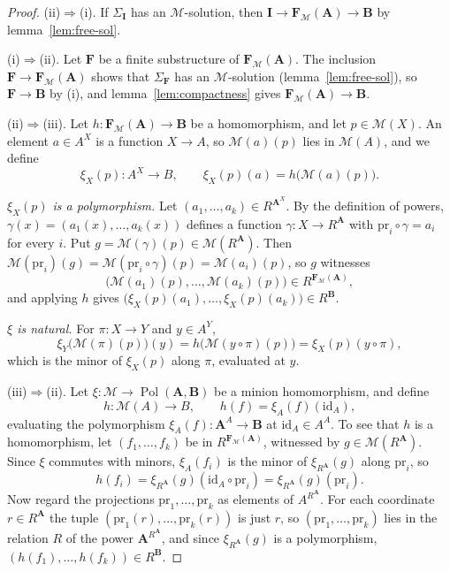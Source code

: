 \documentclass[11pt]{article}
\theoremstyle{plain}
\theoremstyle{definition}
\newcommand{\Pol}{\operatorname{Pol}}
\newcommand{\pr}{\mathrm{pr}}
\newcommand{\id}{\mathrm{id}}
\newcommand{\bA}{\mathbf{A}}
\newcommand{\bB}{\mathbf{B}}
\newcommand{\bI}{\mathbf{I}}
\newcommand{\bF}{\mathbf{F}}
\newcommand{\M}{\mathscr{M}}
\begin{document}
\begin{proof}
(ii)$\Rightarrow$(i). If $\Sigma_{\bI}$ has an $\M$-solution, then $\bI\to\bF_\M(\bA)\to\bB$ by lemma~\ref{lem:free-sol}.

(i)$\Rightarrow$(ii). Let $\bF$ be a finite substructure of $\bF_\M(\bA)$. The inclusion $\bF\to\bF_\M(\bA)$ shows that $\Sigma_{\bF}$ has an $\M$-solution (lemma~\ref{lem:free-sol}), so $\bF\to\bB$ by (i), and lemma~\ref{lem:compactness} gives $\bF_\M(\bA)\to\bB$.

(ii)$\Rightarrow$(iii). Let $h\colon\bF_\M(\bA)\to\bB$ be a homomorphism, and let $p\in\M(X)$. An element $a\in A^X$ is a function $X\to A$, so $\M(a)(p)$ lies in $\M(A)$, and we define
\[
\xi_X(p)\colon A^X\to B,\qquad\xi_X(p)(a)=h\big(\M(a)(p)\big).
\]

\emph{$\xi_X(p)$ is a polymorphism.} Let $(a_1,\dots,a_k)\in R^{\bA^X}$. By the definition of powers, $\gamma(x)=(a_1(x),\dots,a_k(x))$ defines a function $\gamma\colon X\to R^{\bA}$ with $\pr_i\circ\gamma=a_i$ for every $i$. Put $g=\M(\gamma)(p)\in\M(R^{\bA})$. Then $\M(\pr_i)(g)=\M(\pr_i\circ\gamma)(p)=\M(a_i)(p)$, so $g$ witnesses
\[
\big(\M(a_1)(p),\dots,\M(a_k)(p)\big)\in R^{\bF_\M(\bA)},
\]
and applying $h$ gives $\big(\xi_X(p)(a_1),\dots,\xi_X(p)(a_k)\big)\in R^{\bB}$.

\emph{$\xi$ is natural.} For $\pi\colon X\to Y$ and $y\in A^Y$,
\[
\xi_Y\big(\M(\pi)(p)\big)(y)=h\big(\M(y\circ\pi)(p)\big)=\xi_X(p)(y\circ\pi),
\]
which is the minor of $\xi_X(p)$ along $\pi$, evaluated at $y$.

(iii)$\Rightarrow$(ii). Let $\xi\colon\M\to\Pol(\bA,\bB)$ be a minion homomorphism, and define
\[
h\colon\M(A)\to B,\qquad h(f)=\xi_A(f)(\id_A),
\]
evaluating the polymorphism $\xi_A(f)\colon\bA^A\to\bB$ at $\id_A\in A^A$. To see that $h$ is a homomorphism, let $(f_1,\dots,f_k)$ be in $R^{\bF_\M(\bA)}$, witnessed by $g\in\M(R^{\bA})$. Since $\xi$ commutes with minors, $\xi_A(f_i)$ is the minor of $\xi_{R^{\bA}}(g)$ along $\pr_i$, so
\[
h(f_i)=\xi_{R^{\bA}}(g)(\id_A\circ\pr_i)=\xi_{R^{\bA}}(g)(\pr_i).
\]
Now regard the projections $\pr_1,\dots,\pr_k$ as elements of $A^{R^{\bA}}$. For each coordinate $r\in R^{\bA}$ the tuple $(\pr_1(r),\dots,\pr_k(r))$ is just $r$, so $(\pr_1,\dots,\pr_k)$ lies in the relation $R$ of the power $\bA^{R^{\bA}}$, and since $\xi_{R^{\bA}}(g)$ is a polymorphism, $(h(f_1),\dots,h(f_k))\in R^{\bB}$.
\end{proof}
\end{document}
